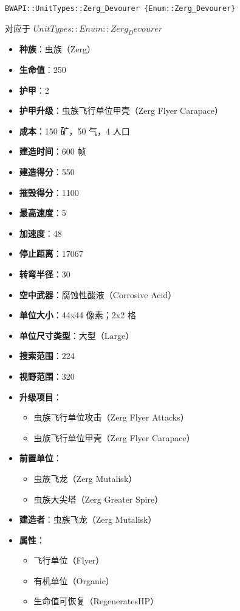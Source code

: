 \begin{tcolorbox}[colback=white, colframe=black!60!white, title=Zerg\_Devourer(), arc=0mm]
    \begin{verbatim}
BWAPI::UnitTypes::Zerg_Devourer {Enum::Zerg_Devourer}
    \end{verbatim}
    对应于  $ UnitTypes::Enum::Zerg_Devourer $ 
    \begin{itemize}
        \item \textbf{种族}：虫族（Zerg）
        \item \textbf{生命值}：250
        \item \textbf{护甲}：2
        \item \textbf{护甲升级}：虫族飞行单位甲壳（Zerg Flyer Carapace）
        \item \textbf{成本}：150 矿，50 气，4 人口
        \item \textbf{建造时间}：600 帧
        \item \textbf{建造得分}：550
        \item \textbf{摧毁得分}：1100
        \item \textbf{最高速度}：5
        \item \textbf{加速度}：48
        \item \textbf{停止距离}：17067
        \item \textbf{转弯半径}：30
        \item \textbf{空中武器}：腐蚀性酸液（Corrosive Acid）
        \item \textbf{单位大小}：44x44 像素；2x2 格
        \item \textbf{单位尺寸类型}：大型（Large）
        \item \textbf{搜索范围}：224
        \item \textbf{视野范围}：320
        \item \textbf{升级项目}：
            \begin{itemize}
                \item 虫族飞行单位攻击（Zerg Flyer Attacks）
                \item 虫族飞行单位甲壳（Zerg Flyer Carapace）
            \end{itemize}
        \item \textbf{前置单位}：
            \begin{itemize}
                \item 虫族飞龙（Zerg Mutalisk）
                \item 虫族大尖塔（Zerg Greater Spire）
            \end{itemize}
        \item \textbf{建造者}：虫族飞龙（Zerg Mutalisk）
        \item \textbf{属性}：
            \begin{itemize}
                \item 飞行单位（Flyer）
                \item 有机单位（Organic）
                \item 生命值可恢复（RegeneratesHP）
            \end{itemize}
    \end{itemize}
\end{tcolorbox}

